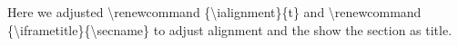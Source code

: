 \begingroup
\renewcommand{\ialignment}{t}
\renewcommand{\iframetitle}{\secname}
\begin{iframe}[-10pt]
	Here we adjusted \textbackslash renewcommand \{\textbackslash ialignment\}\{t\} and  \textbackslash renewcommand \{\textbackslash iframetitle\}\{\textbackslash secname\} to adjust alignment and the show the section as title.
\end{iframe}
\endgroup